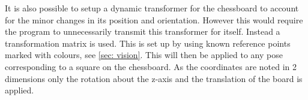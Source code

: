 It is also possible to setup a dynamic transformer for the chessboard to account for the minor changes in its position and orientation. However this would require the program to unnecessarily transmit this transformer for itself. Instead a transformation matrix is used. This is set up by using known reference points marked with colours, see \cref{sec: vision}. This will then be applied to any pose corresponding to a square on the chessboard. As the coordinates are noted in 2 dimensions only the rotation about the z-axis and the translation of the board is applied. 
